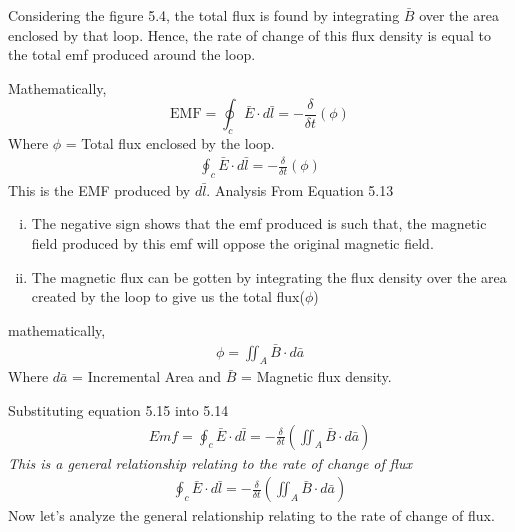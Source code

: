 Considering the figure 5.4, the total flux is found by integrating $\bar{B}$ over the area enclosed by that loop. Hence, the rate of change of this flux density is equal to the total emf produced around the loop.

Mathematically,
\begin{dmath}
	\text{EMF} = \oint_c\bar{E} \cdot d\bar{l} = -\frac{\delta}{\delta t}(\phi)
\end{dmath}
Where $\phi$ = Total flux enclosed by the loop.
\begin{align}
	\boxed{\oint_c\bar{E} \cdot d\bar{l} = -\frac{\delta}{\delta t}(\phi)}
\end{align}
This is the EMF produced by\emph{ $d\bar{l}$}. Analysis From Equation 5.13
\begin{enumerate}[(i)]
	\item The negative sign shows that the emf produced is such that, the magnetic field produced by this emf will oppose the original magnetic field. 
	\item The magnetic flux can be gotten by integrating the flux density over the area created by the loop to give us the total flux($\phi$) 
\end{enumerate}
mathematically,
\begin{align}
	\phi = \iint_A\bar{B} \cdot d\bar{a}
\end{align}
Where $d\bar{a}$ = Incremental Area and $\bar{B}$ = Magnetic flux density.

Substituting equation 5.15 into 5.14 
\begin{align*}
	\boxed{Emf = \oint_c\bar{E}\cdot d\bar{l} = -\frac{\delta}{\delta t} (\iint_A\bar{B}\cdot d\bar{a})}
\end{align*}
\emph{This is a general relationship relating to the rate of change of flux}	
\begin{align}
	\boxed{\oint_c\bar{E}\cdot d\bar{l} = -\frac{\delta}{\delta t} (\iint_A\bar{B}\cdot d\bar{a})}
\end{align} 
Now let's analyze the general relationship relating to the rate of change of flux.


